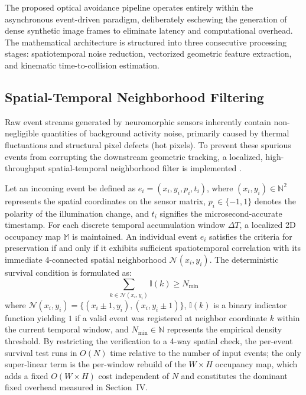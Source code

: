 \documentclass[conference]{IEEEtran}
\begin{document}
The proposed optical avoidance pipeline operates entirely within the asynchronous event-driven paradigm, deliberately eschewing the generation of dense synthetic image frames to eliminate latency and computational overhead. The mathematical architecture is structured into three consecutive processing stages: spatiotemporal noise reduction, vectorized geometric feature extraction, and kinematic time-to-collision estimation.

\subsection{Spatial-Temporal Neighborhood Filtering}
Raw event streams generated by neuromorphic sensors inherently contain non-negligible quantities of background activity noise, primarily caused by thermal fluctuations and structural pixel defects (hot pixels). To prevent these spurious events from corrupting the downstream geometric tracking, a localized, high-throughput spatial-temporal neighborhood filter is implemented \cite{b15}.

Let an incoming event be defined as $e_i = (x_i, y_i, p_i, t_i)$, where $(x_i, y_i) \in \mathbb{N}^2$ represents the spatial coordinates on the sensor matrix, $p_i \in \{-1, 1\}$ denotes the polarity of the illumination change, and $t_i$ signifies the microsecond-accurate timestamp. For each discrete temporal accumulation window $\Delta T$, a localized 2D occupancy map $\mathbb{M}$ is maintained. An individual event $e_i$ satisfies the criteria for preservation if and only if it exhibits sufficient spatiotemporal correlation with its immediate 4-connected spatial neighborhood $\mathcal{N}(x_i, y_i)$. The deterministic survival condition is formulated as:
\begin{equation}
    \sum_{k \in \mathcal{N}(x_i, y_i)} \mathbb{I}(k) \ge N_{\min}
\end{equation}
where $\mathcal{N}(x_i, y_i) = \{(x_i\pm1, y_i), (x_i, y_i\pm1)\}$, $\mathbb{I}(k)$ is a binary indicator function yielding $1$ if a valid event was registered at neighbor coordinate $k$ within the current temporal window, and $N_{\min} \in \mathbb{N}$ represents the empirical density threshold. By restricting the verification to a 4-way spatial check, the per-event survival test runs in $O(N)$ time relative to the number of input events; the only super-linear term is the per-window rebuild of the $W \times H$ occupancy map, which adds a fixed $O(W \times H)$ cost independent of $N$ and constitutes the dominant fixed overhead measured in Section~IV.
\end{document}
